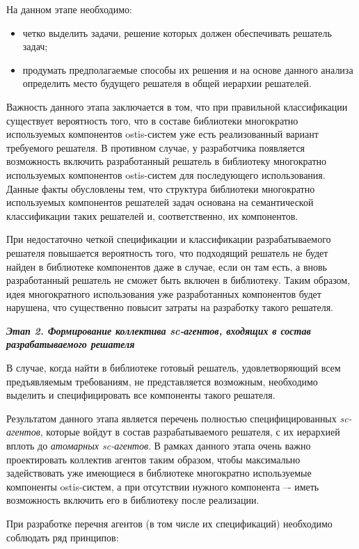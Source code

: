 На данном этапе необходимо:
\begin{itemize}
\item четко выделить задачи, решение которых должен обеспечивать решатель задач;
\item продумать предполагаемые способы их решения и на основе данного анализа определить место будущего решателя в общей иерархии решателей.
\end{itemize}

Важность данного этапа заключается в том, что при правильной классификации существует вероятность того, что в составе библиотеки многократно используемых компонентов ostis-систем уже есть реализованный вариант требуемого решателя. В противном случае, у разработчика появляется возможность включить разработанный решатель в библиотеку многократно используемых компонентов ostis-систем для последующего использования. Данные факты обусловлены тем, что структура библиотеки многократно используемых компонентов решателей задач основана на семантической классификации таких решателей и, соответственно, их компонентов.

При недостаточно четкой спецификации и классификации разрабатываемого решателя повышается вероятность того, что подходящий решатель не будет найден в библиотеке компонентов даже в случае, если он там есть, а вновь разработанный решатель не сможет быть включен в библиотеку. Таким образом, идея многократного использования уже разработанных компонентов будет нарушена, что существенно повысит затраты на разработку такого решателя.

\textbf{\textit{Этап 2. Формирование коллектива sc-агентов, входящих в состав разрабатываемого решателя}}

В случае, когда найти в библиотеке готовый решатель, удовлетворяющий всем предъявляемым требованиям, не представляется возможным, необходимо выделить и специфицировать все компоненты такого решателя.

Результатом данного этапа является перечень полностью специфицированных \textit{sc-агентов}, которые войдут в состав разрабатываемого решателя, с их иерархией вплоть до \textit{атомарных sc-агентов}. В рамках данного этапа очень важно проектировать коллектив агентов таким образом, чтобы максимально задействовать уже имеющиеся в библиотеке многократно используемые компоненты ostis-систем, а при отсутствии нужного компонента –- иметь возможность включить его в библиотеку после реализации.

При разработке перечня агентов (в том числе их спецификаций) необходимо соблюдать ряд принципов:

